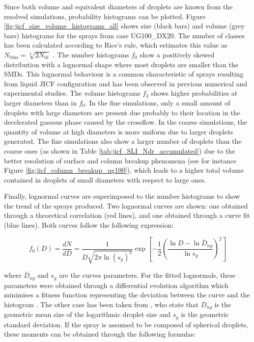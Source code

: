 Since both volume and equivalent diameters of droplets are known from the resolved simulations, probability histograms can be plotted. Figure \ref{fig:jicf_size_volume_histograms_all} shows size (black bars) and volume (grey bars) histograms for the sprays from case UG100\_DX20. The number of classes has been calculated according to Rice's rule, which estimates this value as $N_\mathrm{bins} = \sqrt[3]{2 N_\mathrm{dr}}$ . The number histograms $f_0$ show a positively skewed distribution with a lognormal shape where most droplets are smaller than the SMDs. This lognormal behaviour is a common characteristic of sprays resulting from liquid JICF configuration and has been observed in previous numerical  and experimental  studies. The volume histograms $f_3$ shows higher probabilities at larger diameters than in $f_0$. In the fine simulations, only a small amount of droplets with large diameters are present due probably to their location in the decelerated gaseous phase caused by the crossflow. In the coarse simulations, the quantity of volume at high diameters is more uniform due to larger droplets generated. The fine simulations also show a larger number of droplets than the coarse ones (as shown in Table \ref{tab:jicf_SLI_Ndr_accumulated}) due to the better resolution of surface and column breakup phenomena (see for instance Figure \ref{fig:jicf_column_breakup_ug100}), which leads to a higher total volume contained in droplets of small diameters with respect to large ones.

Finally, lognormal curves are superimposed to the number histograms to show the trend of the sprays produced. Two lognormal curves are shown: one obtained through a theoretical correlation (red lines), and one obtained through a curve fit (blue lines). Both curves follow the following expression:

\begin{equation}
\label{eq:ch5_f0_lognormal_distr_expression}
 f_0 \left( D \right) = \frac{d N}{d D} =  \frac{1}{D  \sqrt{2 \pi \ln \left( s_g \right)^2}} \exp \left[ - \frac{1}{2 } \left( \frac{\ln D - \ln \overline{D}_{ng}}{\ln s_g}   \right)^2 \right]
\end{equation}

where $\overline{D}_{ng}$ and $s_g$ are the curves parameters. For the fitted lognormals, these parameters were obtained through a differential evolution algorithm which minimises a fitness function representing the deviation between the curve and the histogram . The other case has been taken from  , who state that $\overline{D}_{ng}$ is the geometric mean size of the logarithmic droplet size and $s_g$ is the geometric standard deviation. If the spray is assumed to be composed of spherical droplets, these moments can be obtained through the following formulas: 

